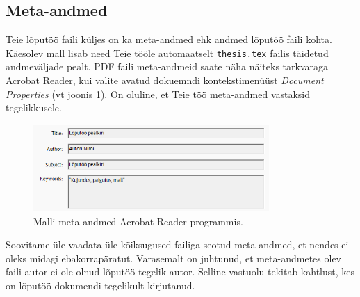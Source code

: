 \subsection{Meta-andmed}
Teie lõputöö faili küljes on ka meta-andmed ehk andmed lõputöö faili kohta. Käesolev mall lisab need Teie tööle automaatselt \verb|thesis.tex| failis täidetud andmeväljade pealt. PDF faili meta-andmeid saate näha näiteks tarkvaraga Acrobat Reader, kui valite avatud dokuemndi kontekstimenüüst \emph{Document Properties} (vt joonis \ref{fig:metaAndmed}). On oluline, et Teie töö meta-andmed vastaksid tegelikkusele.

\begin{figure}[htb!]
    \centering
    \captionsetup{justification=centering}
    \includegraphics[width=0.8\textwidth]{figures/Joonis4-MetaAndmed.png}
    \caption{Malli meta-andmed Acrobat Reader programmis.}
    \label{fig:metaAndmed}
\end{figure}

Soovitame üle vaadata üle kõiksugused failiga seotud meta-andmed, et nendes ei oleks midagi ebakorrapäratut. Varasemalt on juhtunud, et meta-andmetes olev faili autor ei ole olnud lõputöö tegelik autor. Selline vastuolu tekitab kahtlust, kes on lõputöö dokumendi tegelikult kirjutanud.
